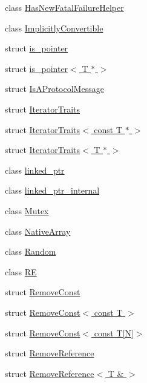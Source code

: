 \begin{DoxyCompactItemize}
class \hyperlink{classtesting_1_1internal_1_1_has_new_fatal_failure_helper}{Has\+New\+Fatal\+Failure\+Helper}
\item 
class \hyperlink{classtesting_1_1internal_1_1_implicitly_convertible}{Implicitly\+Convertible}
\item 
struct \hyperlink{structtesting_1_1internal_1_1is__pointer}{is\+\_\+pointer}
\item 
struct \hyperlink{structtesting_1_1internal_1_1is__pointer_3_01_t_01_5_01_4}{is\+\_\+pointer$<$ T $\ast$ $>$}
\item 
struct \hyperlink{structtesting_1_1internal_1_1_is_a_protocol_message}{Is\+A\+Protocol\+Message}
\item 
struct \hyperlink{structtesting_1_1internal_1_1_iterator_traits}{Iterator\+Traits}
\item 
struct \hyperlink{structtesting_1_1internal_1_1_iterator_traits_3_01const_01_t_01_5_01_4}{Iterator\+Traits$<$ const T $\ast$ $>$}
\item 
struct \hyperlink{structtesting_1_1internal_1_1_iterator_traits_3_01_t_01_5_01_4}{Iterator\+Traits$<$ T $\ast$ $>$}
\item 
class \hyperlink{classtesting_1_1internal_1_1linked__ptr}{linked\+\_\+ptr}
\item 
class \hyperlink{classtesting_1_1internal_1_1linked__ptr__internal}{linked\+\_\+ptr\+\_\+internal}
\item 
class \hyperlink{classtesting_1_1internal_1_1_mutex}{Mutex}
\item 
class \hyperlink{classtesting_1_1internal_1_1_native_array}{Native\+Array}
\item 
class \hyperlink{classtesting_1_1internal_1_1_random}{Random}
\item 
class \hyperlink{classtesting_1_1internal_1_1_r_e}{R\+E}
\item 
struct \hyperlink{structtesting_1_1internal_1_1_remove_const}{Remove\+Const}
\item 
struct \hyperlink{structtesting_1_1internal_1_1_remove_const_3_01const_01_t_01_4}{Remove\+Const$<$ const T $>$}
\item 
struct \hyperlink{structtesting_1_1internal_1_1_remove_const_3_01const_01_t[_n]_4}{Remove\+Const$<$ const T\mbox{[}\+N\mbox{]}$>$}
\item 
struct \hyperlink{structtesting_1_1internal_1_1_remove_reference}{Remove\+Reference}
\item 
struct \hyperlink{structtesting_1_1internal_1_1_remove_reference_3_01_t_01_6_01_4}{Remove\+Reference$<$ T \& $>$}

\end{DoxyCompactItemize}
